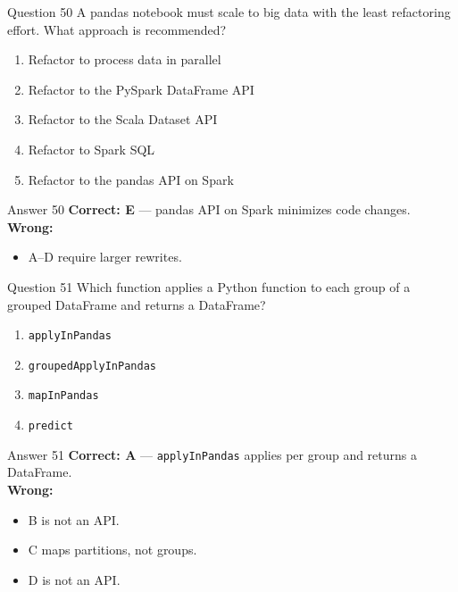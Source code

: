 \documentclass[aspectratio=169,11pt]{beamer}
\begin{document}
	\begin{frame}{Question 50}
		A pandas notebook must scale to big data with the least refactoring effort. What approach is recommended?
		\begin{enumerate}[label=\Alph*.]
			\item Refactor to process data in parallel
			\item Refactor to the PySpark DataFrame API
			\item Refactor to the Scala Dataset API
			\item Refactor to Spark SQL
			\item Refactor to the pandas API on Spark
		\end{enumerate}
	\end{frame}
	\begin{frame}{Answer 50}
		\textbf{Correct: E} --- pandas API on Spark minimizes code changes.\\
		\vspace{0.5em}
		\textbf{Wrong:}
		\begin{itemize}
			\item A--D require larger rewrites.
		\end{itemize}
	\end{frame}
	
	\begin{frame}{Question 51}
		Which function applies a Python function to each group of a grouped DataFrame and returns a DataFrame?
		\begin{enumerate}[label=\Alph*.]
			\item \texttt{applyInPandas}
			\item \texttt{groupedApplyInPandas}
			\item \texttt{mapInPandas}
			\item \texttt{predict}
		\end{enumerate}
	\end{frame}
	\begin{frame}{Answer 51}
		\textbf{Correct: A} --- \texttt{applyInPandas} applies per group and returns a DataFrame.\\
		\vspace{0.5em}
		\textbf{Wrong:}
		\begin{itemize}
			\item B is not an API.
			\item C maps partitions, not groups.
			\item D is not an API.
		\end{itemize}
	\end{frame}
	
\end{document}

